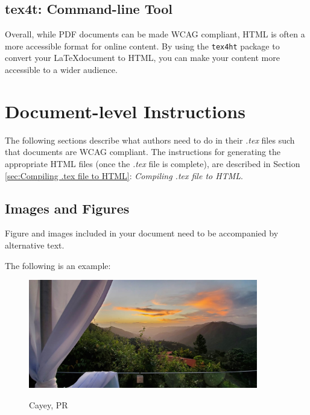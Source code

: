 \documentclass{llncs}
\newcommand{\code}[1]{\colorbox{light-gray}{\texttt{#1}}}
\begin{document}
\subsection{tex4t: Command-line Tool}

Overall, while PDF documents can be made WCAG compliant, HTML is often a more
accessible format for online content. By using the \code{tex4ht} package to
convert your \LaTeX document to HTML, you can make your content more accessible
to a wider audience.



\section{Document-level Instructions}

The following sections describe what authors need to do in their \textit{.tex}
files such that documents are WCAG compliant. The instructions for generating
the appropriate HTML files (once the \textit{.tex} file is complete), are
described in Section \ref{sec:Compiling .tex file to HTML}: \textit{Compiling
  .tex file to HTML}.


\subsection{Images and Figures}

Figure and images included in your document need to be accompanied by
alternative text.

The following is an example:

\begin{figure}
  \centering
  \includegraphics[alt={Alt Text}, width=10cm]{figs/Cayey.jpeg}
  \caption{Cayey, PR}
  \label{fig:earth}
\end{figure}
\end{document}
